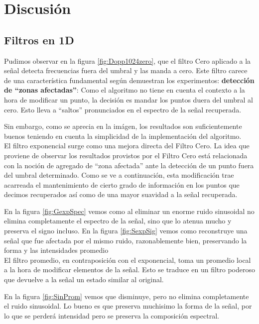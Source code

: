 \section{Discusi\'on}

\subsection{Filtros en 1D}

Pudimos observar en la figura \ref{fig:Dopp1024zero}, que el filtro Cero
aplicado a la se\~nal detecta frecuencias fuera del umbral y
las manda a cero. Este filtro carece de una caracter\'istica fundamental
seg\'un demuestran los experimentos:
{\bf detecci\'on de ``zonas afectadas''}: Como el algoritmo no tiene en
cuenta el contexto a la hora de modificar un punto, la decisi\'on es mandar los
puntos duera del umbral al cero. Esto lleva a ``saltos'' pronunciados en
el espectro de la se\~nal recuperada.

Sin embargo, como se aprecia en la im\'agen, los resultados son suficientemente
buenos teniendo en cuenta la simplicidad de la implementaci\'on del algoritmo.\\

El filtro exponencial surge como una mejora directa del Filtro Cero.
La idea que proviene de
observar los resultados provistos por el Filtro Cero est\'a relacionada con la
noci\'on de agregado de ``zona afectada'' ante la detecci\'on de un punto fuera
del umbral determinado. Como se ve a continuaci\'on, esta modificaci\'on trae
acarreada el mantenimiento de cierto grado de informaci\'on en los puntos que
decimos recuperados as\'i como de una mayor suavidad a la se\~nal recuperada.

En la figura \ref{fig:GexpSpec} vemos como al eliminar un enorme ruido
sinusoidal no elimina completamente el espectro de la se\~nal, sino que
lo atenua mucho y preserva el signo incluso. En la figura \ref{fig:SexpSig} vemos
como reconstruye una se\~nal que fue afectada por el mismo ruido, razonablemente
bien, preservando la forma y las intensidades promedio\\


El filtro promedio, en contraposici\'on con el exponencial, toma un promedio
local a la hora de modificar elementos de la se\~nal. Esto se traduce en un
filtro poderoso que devuelve a la se\~nal un estado similar al original.

En la figura \ref{fig:SinProm} vemos que disminuye, pero no elimina completamente
el ruido sinusoidal. Lo bueno es que preserva muchisimo la forma de la
se\~nal, por lo que se perder\'a intensidad pero se preserva la composici\'on
espectral.\\


